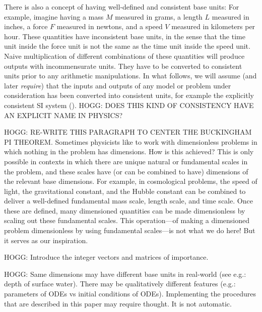 \documentclass[nohyperref]{article}
\theoremstyle{plain}
\theoremstyle{definition}
\theoremstyle{remark}
\begin{document}
There is also a concept of having well-defined and consistent base units:
For example, imagine having a mass $M$ measured in grams, a length $L$ measured in inches, a force $F$ measured in newtons, and a speed $V$ measured in kilometers per hour. These quantities have inconsistent base units, in the sense that the time unit inside the force unit is not the same as the time unit inside the speed unit.
Naive multiplication of different combinations of these quantities will produce outputs with incommensurate units.
They have to be converted to consistent units prior to any arithmetic manipulations.
In what follows, we will assume (and later \emph{require}) that the inputs and outputs of any model or problem under consideration has been converted into consistent units, for example the explicitly consistent SI system (\cite{si}).
HOGG: DOES THIS KIND OF CONSISTENCY HAVE AN EXPLICIT NAME IN PHYSICS?

HOGG: RE-WRITE THIS PARAGRAPH TO CENTER THE BUCKINGHAM PI THEOREM.
Sometimes physicists like to work with dimensionless problems in which nothing in the problem has dimensions.
How is this achieved?
This is only possible in contexts in which there are unique natural or fundamental scales in the problem, and these scales have (or can be combined to have) dimensions of the relevant base dimensions.
For example, in cosmological problems, the speed of light, the gravitational constant, and the Hubble constant can be combined to deliver a well-defined fundamental mass scale, length scale, and time scale.
Once these are defined, many dimensioned quantities can be made dimensionless by scaling out these fundamental scales.
This operation---of making a dimensioned problem dimensionless by using fundamental scales---is not what we do here!
But it serves as our inspiration.

HOGG: Introduce the integer vectors and matrices of importance.

HOGG: Same dimensions may have different base units in real-world (see e.g.: depth of surface water). There may be qualitatively different features (e.g.: parameters of ODEs vs initial conditions of ODEs). Implementing the procedures that are described in this paper may require thought. It is not automatic. 
\end{document}
